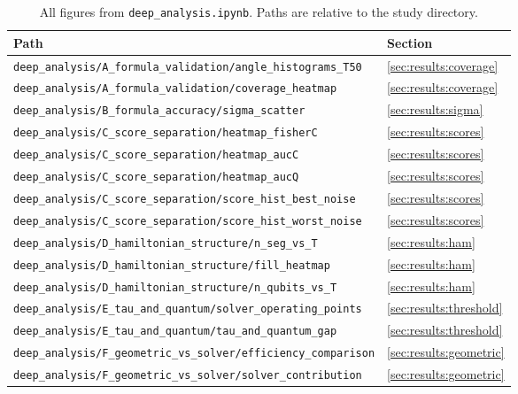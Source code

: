 \documentclass[11pt,a4paper]{article}
\newcommand{\codepath}[1]{\texttt{#1}}
\begin{document}
\begin{table}[H]
  \centering
  \small
  \caption{All figures from \codepath{deep\_analysis.ipynb}.
    Paths are relative to the study directory.}
  \label{tab:figure_index}
  \begin{tabular}{p{8.5cm}l}
    \toprule
    Path & Section \\
    \midrule
    \codepath{deep\_analysis/A\_formula\_validation/angle\_histograms\_T50} &
      \ref{sec:results:coverage} \\
    \codepath{deep\_analysis/A\_formula\_validation/coverage\_heatmap} &
      \ref{sec:results:coverage} \\
    \codepath{deep\_analysis/B\_formula\_accuracy/sigma\_scatter} &
      \ref{sec:results:sigma} \\
    \codepath{deep\_analysis/C\_score\_separation/heatmap\_fisherC} &
      \ref{sec:results:scores} \\
    \codepath{deep\_analysis/C\_score\_separation/heatmap\_aucC} &
      \ref{sec:results:scores} \\
    \codepath{deep\_analysis/C\_score\_separation/heatmap\_aucQ} &
      \ref{sec:results:scores} \\
    \codepath{deep\_analysis/C\_score\_separation/score\_hist\_best\_noise} &
      \ref{sec:results:scores} \\
    \codepath{deep\_analysis/C\_score\_separation/score\_hist\_worst\_noise} &
      \ref{sec:results:scores} \\
    \codepath{deep\_analysis/D\_hamiltonian\_structure/n\_seg\_vs\_T} &
      \ref{sec:results:ham} \\
    \codepath{deep\_analysis/D\_hamiltonian\_structure/fill\_heatmap} &
      \ref{sec:results:ham} \\
    \codepath{deep\_analysis/D\_hamiltonian\_structure/n\_qubits\_vs\_T} &
      \ref{sec:results:ham} \\
    \codepath{deep\_analysis/E\_tau\_and\_quantum/solver\_operating\_points} &
      \ref{sec:results:threshold} \\
    \codepath{deep\_analysis/E\_tau\_and\_quantum/tau\_and\_quantum\_gap} &
      \ref{sec:results:threshold} \\
    \codepath{deep\_analysis/F\_geometric\_vs\_solver/efficiency\_comparison} &
      \ref{sec:results:geometric} \\
    \codepath{deep\_analysis/F\_geometric\_vs\_solver/solver\_contribution} &
      \ref{sec:results:geometric} \\

\end{tabular}
\end{table}
\end{document}
